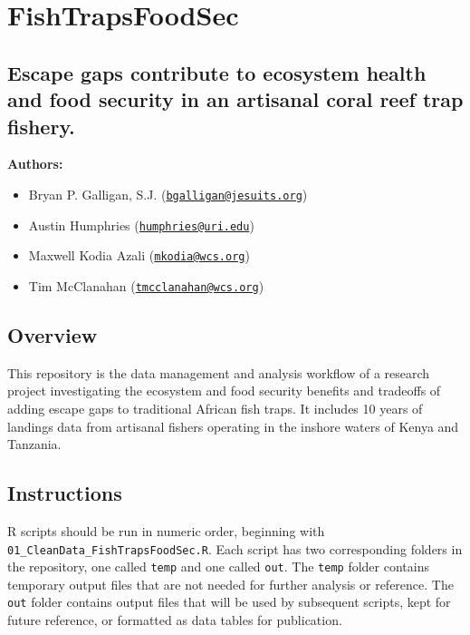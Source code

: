 \documentclass[
]{article}
\author{}
\date{\vspace{-2.5em}}
\begin{document}
\hypertarget{fishtrapsfoodsec}{%
\section{FishTrapsFoodSec}\label{fishtrapsfoodsec}}

\hypertarget{escape-gaps-contribute-to-ecosystem-health-and-food-security-in-an-artisanal-coral-reef-trap-fishery.}{%
\subsection{Escape gaps contribute to ecosystem health and food security
in an artisanal coral reef trap
fishery.}\label{escape-gaps-contribute-to-ecosystem-health-and-food-security-in-an-artisanal-coral-reef-trap-fishery.}}

\textbf{Authors:}

\begin{itemize}
\item
  Bryan P. Galligan, S.J.
  (\href{mailto:bgalligan@jesuits.org}{\nolinkurl{bgalligan@jesuits.org}})
\item
  Austin Humphries
  (\href{mailto:humphries@uri.edu}{\nolinkurl{humphries@uri.edu}})
\item
  Maxwell Kodia Azali
  (\href{mailto:mkodia@wcs.org}{\nolinkurl{mkodia@wcs.org}})
\item
  Tim McClanahan
  (\href{mailto:tmcclanahan@wcs.org}{\nolinkurl{tmcclanahan@wcs.org}})
\end{itemize}

\hypertarget{overview}{%
\subsection{Overview}\label{overview}}

This repository is the data management and analysis workflow of a
research project investigating the ecosystem and food security benefits
and tradeoffs of adding escape gaps to traditional African fish traps.
It includes 10 years of landings data from artisanal fishers operating
in the inshore waters of Kenya and Tanzania.

\hypertarget{instructions}{%
\subsection{Instructions}\label{instructions}}

R scripts should be run in numeric order, beginning with
\texttt{01\_CleanData\_FishTrapsFoodSec.R}. Each script has two
corresponding folders in the repository, one called \texttt{temp} and
one called \texttt{out}. The \texttt{temp} folder contains temporary
output files that are not needed for further analysis or reference. The
\texttt{out} folder contains output files that will be used by
subsequent scripts, kept for future reference, or formatted as data
tables for publication.
\end{document}
